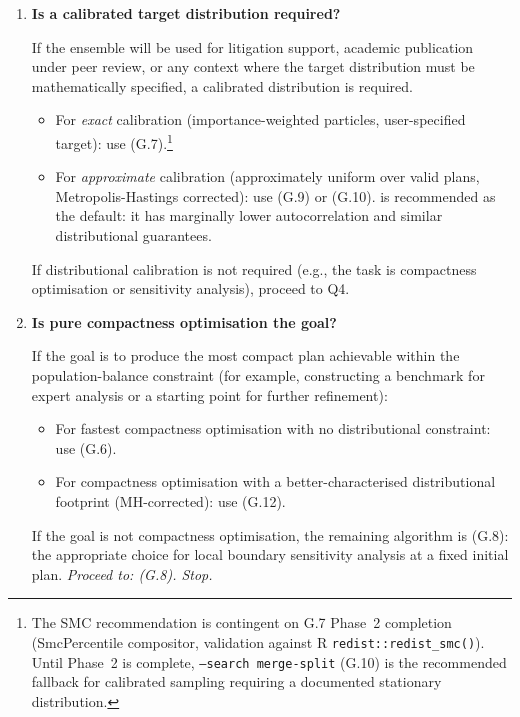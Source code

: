 \begin{enumerate}[label=\textbf{Q\arabic*.}]
    For $k < 15$, single-scale chains mix adequately; proceed to Q3.

  \item \textbf{Is a calibrated target distribution required?}

    If the ensemble will be used for litigation support, academic
    publication under peer review, or any context where the target
    distribution must be mathematically specified, a calibrated distribution
    is required.

    \begin{itemize}
      \item For \emph{exact} calibration (importance-weighted particles,
            user-specified target): use \smc{} (G.7).\footnote{%
              The SMC recommendation is contingent on G.7 Phase~2 completion
              (SmcPercentile compositor, validation against R
              \texttt{redist::redist\_smc()}).
              Until Phase~2 is complete, \texttt{--search merge-split} (G.10)
              is the recommended fallback for calibrated sampling requiring a
              documented stationary distribution.}
      \item For \emph{approximate} calibration (approximately uniform over
            valid plans, Metropolis-Hastings corrected): use \fr{} (G.9)
            or \msp{} (G.10).
            \msp{} is recommended as the default: it has marginally lower
            autocorrelation and similar distributional guarantees.
    \end{itemize}

    If distributional calibration is not required (e.g., the task is
    compactness optimisation or sensitivity analysis), proceed to Q4.

  \item \textbf{Is pure compactness optimisation the goal?}

    If the goal is to produce the most compact plan achievable within
    the population-balance constraint (for example, constructing a
    benchmark for expert analysis or a starting point for further
    refinement):

    \begin{itemize}
      \item For fastest compactness optimisation with no distributional
            constraint: use \sburst{} (G.6).
      \item For compactness optimisation with a better-characterised
            distributional footprint (MH-corrected): use
            \sburstf{} (G.12).
    \end{itemize}

    If the goal is not compactness optimisation, the remaining algorithm
    is \flip{} (G.8): the appropriate choice for local boundary sensitivity
    analysis at a fixed initial plan.
    \emph{Proceed to: \flip{} (G.8). Stop.}

\end{enumerate}

